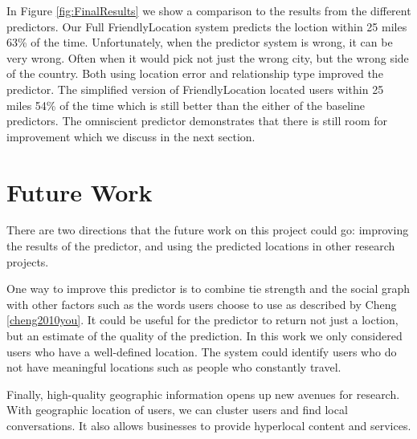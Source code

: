 \documentclass{sig-alternate}
\begin{document}
In Figure \ref{fig:FinalResults} we show a comparison to the results from the 
different predictors.
Our Full FriendlyLocation system predicts the loction within 25 miles 63\% of
the time.
Unfortunately, when the predictor system is wrong, it can be very wrong.
Often when it would pick not just the wrong city, but the wrong side of the
country.
Both using location error and relationship type improved the predictor.  The
simplified version of FriendlyLocation located users within 25 miles 54\% of
the time which is still better than the either of the baseline predictors.
The omniscient predictor demonstrates that there is still room for improvement
which we discuss in the next section.

\section{Future Work}
There are two directions that the future work on this project could go:
improving the results of the predictor, and using the predicted locations in
other research projects.

One way to improve this predictor is to combine tie strength and the social
graph with other factors such as the words users choose to use as described by Cheng \ref{cheng2010you}.
It could be useful for the predictor to return not just a loction, but an
estimate of the quality of the prediction.  In this work we only considered
users who have a well-defined location. The system could identify users
who do not have meaningful locations such as people who constantly travel.

Finally, high-quality geographic information opens up new avenues for research.
With geographic location of users, we can cluster users and find local conversations.
It also allows businesses to provide hyperlocal content and services.

 
\end{document}
